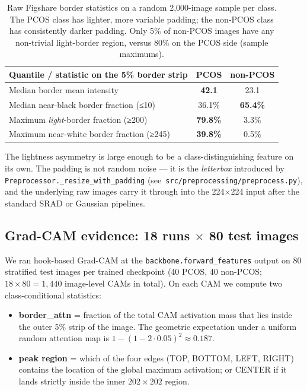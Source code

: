 \documentclass[11pt]{article}
\begin{document}
\begin{table}[H]
\centering
\small
\begin{tabular}{lcc}
\toprule
\textbf{Quantile / statistic on the 5\% border strip} & \textbf{PCOS} & \textbf{non-PCOS} \\
\midrule
Median border mean intensity               & \textbf{42.1} & 23.1 \\
Median near-black border fraction (≤10)    & 36.1\%       & \textbf{65.4\%} \\
Maximum \emph{light}-border fraction (≥200)  & \textbf{79.8\%} & 3.3\% \\
Maximum near-white border fraction (≥245)    & \textbf{39.8\%} & 0.5\% \\
\bottomrule
\end{tabular}
\caption{Raw Figshare border statistics on a random 2,000-image sample per
class. The PCOS class has lighter, more variable padding; the non-PCOS class
has consistently darker padding. Only 5\% of non-PCOS images have any
non-trivial light-border region, versus 80\% on the PCOS side (sample
maximums).}
\label{tab:border-stat}
\end{table}

The lightness asymmetry is large enough to be a class-distinguishing feature
on its own. The padding is not random noise --- it is the
\emph{letterbox} introduced by \texttt{Preprocessor.\_resize\_with\_padding}
(see~\texttt{src/preprocessing/preprocess.py}), and the underlying raw
images carry it through into the 224$\times$224 input after the standard
SRAD or Gaussian pipelines.

\subsection{Grad-CAM evidence: 18 runs $\times$ 80 test images}
\label{sec:gradcam}

We ran hook-based Grad-CAM at the \texttt{backbone.forward\_features} output
on 80 stratified test images per trained checkpoint (40 PCOS, 40 non-PCOS;
$18 \times 80 = 1{,}440$ image-level CAMs in total). On each CAM we compute
two class-conditional statistics:

\begin{itemize}
  \item \textbf{border\_attn} = fraction of the total CAM activation mass
        that lies inside the outer 5\% strip of the image. The geometric
        expectation under a uniform random attention map is
        $1 - (1 - 2 \cdot 0.05)^2 \approx 0.187$.
  \item \textbf{peak region} = which of the four edges (TOP, BOTTOM, LEFT,
        RIGHT) contains the location of the global maximum activation; or
        CENTER if it lands strictly inside the inner $202 \times 202$
        region.
\end{itemize}
\end{document}
